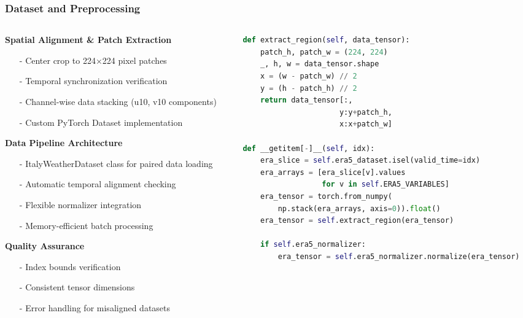 \documentclass[footline=authortitle]{beamer}
\begin{document}
\begin{frame}[fragile]
\frametitle{Dataset and Preprocessing}
\scriptsize
\begin{columns}
    \begin{column}{0.55\textwidth}
        \textbf{Spatial Alignment \& Patch Extraction}
        \begin{itemize}
            \item[-] Center crop to 224×224 pixel patches
            \item[-] Temporal synchronization verification
            \item[-] Channel-wise data stacking (u10, v10 components)
            \item[-] Custom PyTorch Dataset implementation
        \end{itemize}

        \textbf{Data Pipeline Architecture}
        \begin{itemize}
            \item[-] ItalyWeatherDataset class for paired data loading
            \item[-] Automatic temporal alignment checking
            \item[-] Flexible normalizer integration
            \item[-] Memory-efficient batch processing
        \end{itemize}

        \textbf{Quality Assurance}
        \begin{itemize}
            \item[-] Index bounds verification
            \item[-] Consistent tensor dimensions
            \item[-] Error handling for misaligned datasets
        \end{itemize}
    \end{column}

    \begin{column}{0.45\textwidth}
        \begin{lstlisting}[language=Python, basicstyle=\ttfamily\tiny]
def extract_region(self, data_tensor):
    patch_h, patch_w = (224, 224)
    _, h, w = data_tensor.shape
    x = (w - patch_w) // 2
    y = (h - patch_h) // 2
    return data_tensor[:, 
                      y:y+patch_h, 
                      x:x+patch_w]

def __getitem[-]__(self, idx):
    era_slice = self.era5_dataset.isel(valid_time=idx)
    era_arrays = [era_slice[v].values 
                  for v in self.ERA5_VARIABLES]
    era_tensor = torch.from_numpy(
        np.stack(era_arrays, axis=0)).float()
    era_tensor = self.extract_region(era_tensor)

    if self.era5_normalizer:
        era_tensor = self.era5_normalizer.normalize(era_tensor)
        \end{lstlisting}
    \end{column}
\end{columns}
\end{frame}
\end{document}
